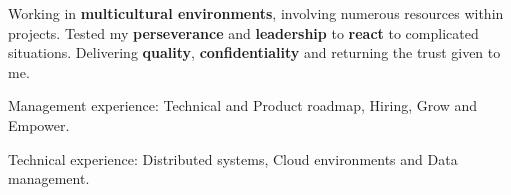 
Working in \textbf{multicultural environments}, involving numerous
resources within projects. Tested my \textbf{perseverance}
and \textbf{leadership} to \textbf{react} to complicated situations.
Delivering \textbf{quality}, \textbf{confidentiality} and returning the
trust given to me.

\vspace{1.5em}

\begin{rlist}
  \item Management experience: Technical and Product roadmap, Hiring, Grow and Empower.
  \item Technical experience: Distributed systems, Cloud environments and Data management.
\end{rlist}
